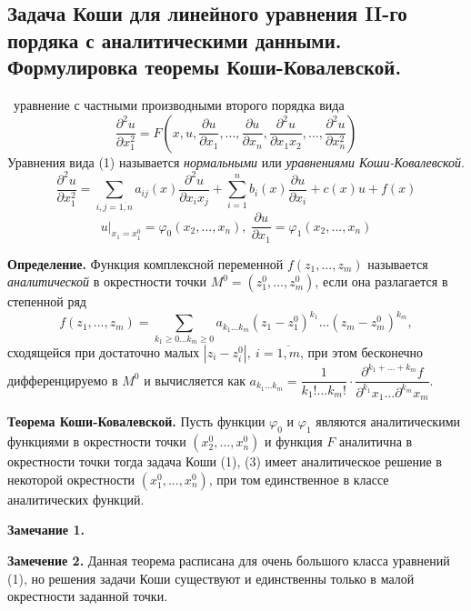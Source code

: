 \documentclass[9pt]{article}
\begin{document}
\subsection{Задача Коши для линейного уравнения II-го пордяка с аналитическими данными. Формулировка теоремы Коши-Ковалевской.}

\ 
 уравнение с частными производными второго порядка вида
\begin{equation}
    \dfrac{\partial^2u}{\partial x_1^2}=F(x,u,\dfrac{\partial u}{\partial x_1},...,\dfrac{\partial u}{\partial x_n},\dfrac{\partial^2u}{\partial x_1x_2},...,\dfrac{\partial^2u}{\partial x_n^2})
\end{equation}
Уравнения вида (1) называется \textit{нормальными} или \textit{уравнениями Коши-Ковалевской}.
\begin{equation}
\dfrac{\partial^2u}{\partial x_1^2}=\displaystyle\sum_{i,j=\overline{1,n}}a_{ij}(x)\dfrac{\partial^2u}{\partial x_ix_j}+\sum_{i=1}^nb_i(x)\dfrac{\partial u}{\partial x_i}+c(x)u+f(x)
\end{equation}
\begin{equation}
    u|_{x_1=x_1^0}=\varphi_0(x_2,...,x_n),\ \dfrac{\partial u}{\partial x_1}=\varphi_1(x_2,...,x_n)
\end{equation}
\par\textbf{Определение.} Функция комплексной переменной \(f(z_1,...,z_m)\) называется \textit{аналитической} в окрестности точки \(M^0=(z_1^0,...,z_m^0)\), если она разлагается в степенной ряд
\[f(z_1,...,z_m)=\displaystyle\sum_{k_1\ge0...k_m\ge0}a_{k_1...k_m}(z_1-z_1^0)^{k_1}...(z_m-z_m^0)^{k_m},\]
сходящейся при достаточно малых \(|z_i-z^0_i|,\ i=\overline{1,m}\), при этом бесконечно дифференцируемо в \(M^0\) и вычисляется как \(a_{k_1...k_m}=\dfrac{1}{k_1!...k_m!}\cdot\dfrac{\partial^{k_1+...+k_m}f}{\partial^{k_1}x_1...\partial^{k_m}x_m}\).
\par\textbf{Теорема Коши-Ковалевской.} Пусть функции \(\varphi_0\) и \(\varphi_1\) являются аналитическими функциями в окрестности точки \((x_2^0,...,x_n^0)\) и функция \(F\) аналитична в окрестности точки тогда задача Коши (1), (3) имеет аналитическое решение в некоторой окрестности \((x_1^0,...,x_n^0)\), при том единственное в классе аналитических функций.
\par\textbf{Замечание 1.}
\par\textbf{Замечение 2.} Данная теорема расписана для очень большого класса уравнений (1), но решения задачи Коши существуют и единственны только в малой окрестности заданной точки.
\end{document}
